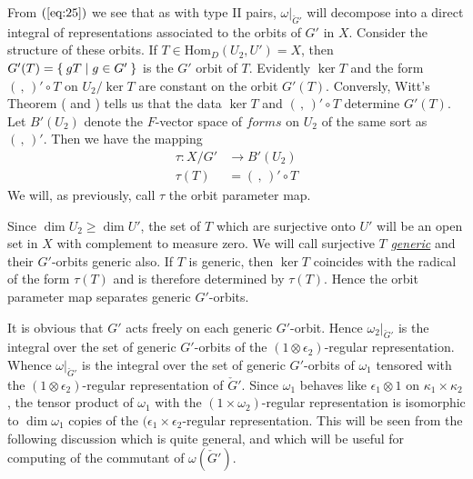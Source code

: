 \documentclass[12pt]{amsart}
\def\emp#1{\underline{\em #1}}
\def\Hom{{\mathrm{Hom}}}
\def\cG{{\check{G}}}
\def\kk{\kappa}
\begin{document}
From $(\ref{eq:25})$ we see that as with type II pairs, $\omega|_{\cG'}$ will 
decompose into a direct integral of representations associated to the orbits
of $G'$ in $X$. Consider the structure of these orbits. 
If $T\in \Hom_D(U_2,U')=X$, then $G'(T) = \Set{gT|g\in G'}$ is the 
$G'$ orbit of $T$. Evidently $\ker T$ 
and the form $(\,,\,)'\circ T$ on $U_2/\ker T$ are constant on the orbit
$G'(T)$. Conversly, Witt's Theorem (\cite{Jacobson1953} and \cite{HoweOsc1})
tells us that the data $\ker T$ and $(\,,\,)'\circ T$ determine $G'(T)$.
Let $B'(U_2)$ denote the $F$-vector space of $forms$ on $U_2$ of 
the same sort as $(\,,\,)'$. Then we have the mapping 
\begin{equation}\label{eq:26}
\begin{split}
\tau \colon X/G' &\to B'(U_2)\\
\tau(T) &= (\,,\,)' \circ T
\end{split}
\end{equation}
We will, as previously, call $\tau$ the orbit parameter map. 

Since $\dim U_2 \geq \dim U'$, the set of $T$ which are surjective 
onto $U'$ will be an open set in $X$ with complement to measure zero. 
We will call surjective $T$ \emp{generic} and their $G'$-orbits generic also.
If $T$ is generic, then $\ker T$ coincides with the radical of the form 
$\tau(T)$ and is therefore determined by $\tau(T)$. 
Hence the orbit parameter map separates generic $G'$-orbits. 

It is obvious that $G'$ acts freely on each generic $G'$-orbit.
Hence $\omega_2|_{\cG'}$ is the integral over the set of generic $G'$-orbits 
of the $(1\otimes \epsilon_2)$-regular representation. 
Whence $\omega|_{\cG'}$ is the integral over the set of 
generic $G'$-orbits of $\omega_1$ tensored with 
the $(1\otimes \epsilon_2)$-regular representation of $\cG'$. 
Since $\omega_1$ behaves like $\epsilon_1\otimes 1$ on $\kk_1\times \kk_2$,
the tensor product of $\omega_1$ with the $(1\times \omega_2)$-regular
representation is isomorphic to $\dim \omega_1$ copies of the 
$(\epsilon_1\times \epsilon_2$-regular representation. This will 
be seen from the following discussion which is quite general, and which will 
be useful for computing of the commutant of $\omega(\cG')$. 
\end{document}
